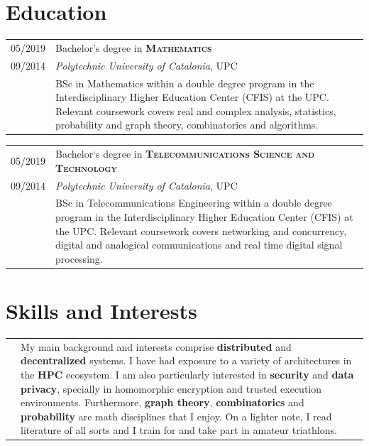 \documentclass[a4paper,10pt]{article} %
\begin{document}
\section{Education}

\begin{tabular}{R{1.5cm}|p{13.8cm}}	
    \textsc{05/2019} & Bachelor's degree in \textbf{\textsc{Mathematics}} \\ 
    \textsc{09/2014} & \small{\emph{Polytechnic University of Catalonia}, UPC}\\
     & \footnotesize{BSc in Mathematics within a double degree program in the Interdisciplinary Higher Education Center (CFIS) at the UPC. Relevant coursework covers real and complex analysis, statistics, probability and graph theory, combinatorics and algorithms.}
\end{tabular}

\begin{tabular}{R{1.5cm}|p{13.8cm}}	
    \textsc{05/2019} &  Bachelor`s degree in \textbf{\textsc{Telecommunications Science and Technology}}\\ 
    \textsc{09/2014} & \small{\emph{Polytechnic University of Catalonia}, UPC} \\
     & \footnotesize{BSc in Telecommunications Engineering within a double degree program in the Interdisciplinary Higher Education Center (CFIS) at the UPC. Relevant coursework covers networking and concurrency, digital and analogical communications and real time digital signal processing.}
\end{tabular}


\section{Skills and Interests}

\begin{tabular}{R{1.5cm}|p{13.8cm}}
    & {My main background and interests comprise \textbf{distributed} and \textbf{decentralized} systems. I have had exposure to a variety of architectures in the \textbf{HPC} ecosystem. I am also particularly interested in \textbf{security} and \textbf{data privacy}, specially in homomorphic encryption and trusted execution environments. Furthermore, \textbf{graph theory}, \textbf{combinatorics} and \textbf{probability} are math disciplines that I enjoy. On a lighter note, I read literature of all sorts and I train for and take part in amateur triathlons.}  \\
\end{tabular}
\end{document}
